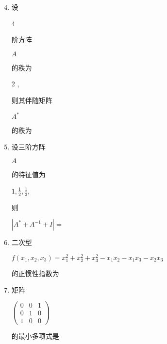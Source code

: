 \documentclass[10pt]{article}
\begin{document}
\begin{enumerate}
  \setcounter{enumi}{3}
  \item \begin{CJK}{UTF8}{mj}设\end{CJK} 4 \begin{CJK}{UTF8}{mj}阶方阵\end{CJK} $A$ \begin{CJK}{UTF8}{mj}的秩为\end{CJK} 2 , \begin{CJK}{UTF8}{mj}则其伴随矩阵\end{CJK} $A^{*}$ \begin{CJK}{UTF8}{mj}的秩为\end{CJK}

  \item \begin{CJK}{UTF8}{mj}设三阶方阵\end{CJK} $A$ \begin{CJK}{UTF8}{mj}的特征值为\end{CJK} $1, \frac{1}{2}, \frac{1}{3}$, \begin{CJK}{UTF8}{mj}则\end{CJK} $\left|A^{*}+A^{-1}+I\right|=$

  \item \begin{CJK}{UTF8}{mj}二次型\end{CJK} $f\left(x_{1}, x_{2}, x_{3}\right)=x_{1}^{2}+x_{2}^{2}+x_{3}^{2}-x_{1} x_{2}-x_{1} x_{3}-x_{2} x_{3}$ \begin{CJK}{UTF8}{mj}的正惯性指数为\end{CJK}

  \item \begin{CJK}{UTF8}{mj}矩阵\end{CJK} $\left(\begin{array}{ccc}0 & 0 & 1 \\ 0 & 1 & 0 \\ 1 & 0 & 0\end{array}\right)$ \begin{CJK}{UTF8}{mj}的最小多项式是\end{CJK}

\end{enumerate}
\end{document}
